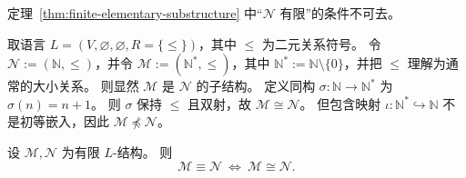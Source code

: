 \documentclass[lang=cn,a4paper,newtx,section]{elegantbook}
\begin{document}
 \begin{remark}
 定理~\ref{thm:finite-elementary-substructure} 中“$\mathcal N$ 有限”的条件不可去。
 \end{remark}

 \begin{example}[同构但非初等子结构]
 取语言 $L=(V,\varnothing,\varnothing, R=\{\le\})$，其中 $\le$ 为二元关系符号。
 令 $\mathcal N:=(\mathbb N,\le)$，并令 $\mathcal M:=(\mathbb N^{*},\le)$，其中 $\mathbb N^{*}:=\mathbb N\setminus\{0\}$，并把 $\le$ 理解为通常的大小关系。
 则显然 $\mathcal M$ 是 $\mathcal N$ 的子结构。
 定义同构 $\sigma:\mathbb N\to\mathbb N^{*}$ 为 $\sigma(n)=n+1$。
 则 $\sigma$ 保持 $\le$ 且双射，故 $\mathcal M\cong\mathcal N$。
 但包含映射 $\iota:\mathbb N^{*}\hookrightarrow\mathbb N$ 不是初等嵌入，因此 $\mathcal M\not\preccurlyeq\mathcal N$。
 \end{example}

 \begin{theorem}
 \label{finite-equivalence-iff-isomorphism}
 设 $\mathcal M,\mathcal N$ 为有限 $L$-结构。
 则
 \[
   \mathcal M\equiv\mathcal N\ \Longleftrightarrow\ \mathcal M\cong\mathcal N.
 \]
 \end{theorem}
\end{document}
